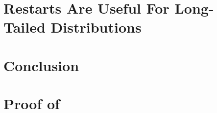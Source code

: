 \documentclass[a4paper,USenglish,cleveref, autoref, thm-restate, pdfa
]{lipics-v2021}
\begin{document}



\section{Restarts Are Useful For Long-Tailed Distributions}




\section{Conclusion}











\section{Proof of~}



\end{document}
